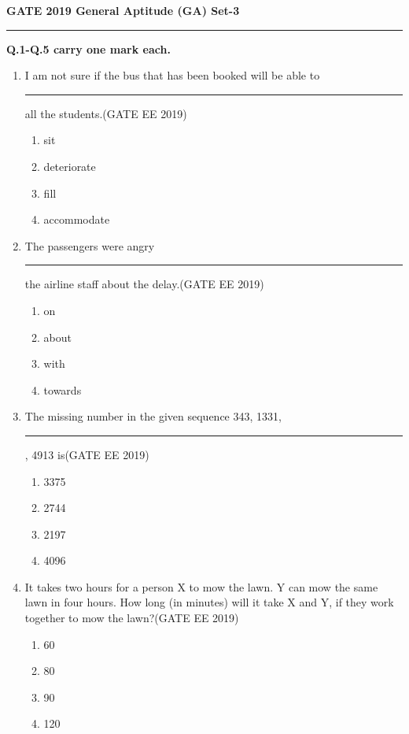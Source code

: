 \documentclass[a4paper,10pt]{exam}
\theoremstyle{remark}
\begin{document}
\raggedright{\textbf{GATE 2019 General Aptitude (GA) Set-3}}\\
\hrule
\vspace{1cm}
\textbf{Q.1-Q.5 carry one mark each.}
\begin{enumerate}
\item I am not sure if the bus that has been booked will be able to \rule{2cm}{0.15mm} all the students.\hfill{(GATE EE 2019)}
\begin{multicols}{4}
\begin{enumerate}
\item sit
\item deteriorate
\item fill
\item accommodate
\end{enumerate}
\end{multicols}
\item  The passengers were angry \rule{2cm}{0.15mm} the airline staff about the delay.\hfill{(GATE EE 2019)}
\begin{multicols}{4}
\begin{enumerate}
\item on
\item about
\item with
\item towards
\end{enumerate}
\end{multicols}
\item The missing number in the given sequence 343, 1331,\rule{1cm}{0.15mm}, 4913 is\hfill{(GATE EE 2019)}
\begin{multicols}{4}
\begin{enumerate}
\item 3375
\item 2744
\item 2197
\item 4096
\end{enumerate}
\end{multicols}
\item It takes two hours for a person X to mow the lawn. Y can mow the same lawn in four hours. How long (in minutes) will it take X and Y, if they work together to mow the lawn?\hfill{(GATE EE 2019)}
\begin{multicols}{4}
\begin{enumerate}
\item 60
\item 80
\item 90
\item 120
\end{enumerate}

\end{multicols}
\end{enumerate}
\end{document}
